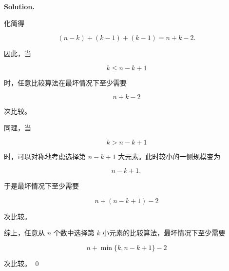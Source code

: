 \documentclass[11pt]{article}
\newenvironment{solution}{
\par\noindent\textbf{Solution.}\par\noindent
}{\qed}
\begin{document}
\begin{solution}
化简得

\[
(n-k)+(k-1)+(k-1)
=
n+k-2.
\]

因此，当

\[
k\leq n-k+1
\]

时，任意比较算法在最坏情况下至少需要

\[
n+k-2
\]

次比较。

同理，当

\[
k>n-k+1
\]

时，可以对称地考虑选择第 \(n-k+1\) 大元素。此时较小的一侧规模变为

\[
n-k+1,
\]

于是最坏情况下至少需要

\[
n+(n-k+1)-2
\]

次比较。

综上，任意从 \(n\) 个数中选择第 \(k\) 小元素的比较算法，最坏情况下至少需要

\[
\boxed{
n+\min\{k,n-k+1\}-2
}
\]

次比较。
\end{solution}
\end{document}

